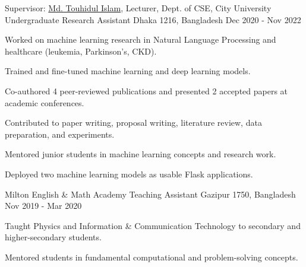 \begin{cventries}


\cventry
  {Supervisor: \href{https://www.linkedin.com/in/touhid000/}{Md. Touhidul Islam}, Lecturer, Dept. of CSE, City University} %
  {Undergraduate Research Assistant} %
  {Dhaka 1216, Bangladesh} %
  {Dec 2020 - Nov 2022} %
  {
    \begin{cvitems} %
      \item{Worked on machine learning research in Natural Language Processing and healthcare (leukemia, Parkinson's, CKD).}
      \item{Trained and fine-tuned machine learning and deep learning models.}
      \item{Co-authored 4 peer-reviewed publications and presented 2 accepted papers at academic conferences.}
      \item{Contributed to paper writing, proposal writing, literature review, data preparation, and experiments.}
      \item{Mentored junior students in machine learning concepts and research work.}
      \item{Deployed two machine learning models as usable Flask applications.}
    \end{cvitems}
  }
  

\cventry
    {Milton English \& Math Academy} %
    {Teaching Assistant} %
    {Gazipur 1750, Bangladesh} %
    {Nov 2019 - Mar 2020} %
    {
        \begin{cvitems} %
        \item {Taught Physics and Information \& Communication Technology to secondary and higher-secondary students.}
        \item{Mentored students in fundamental computational and problem-solving concepts.}
        \end{cvitems}
    }


\end{cventries}
